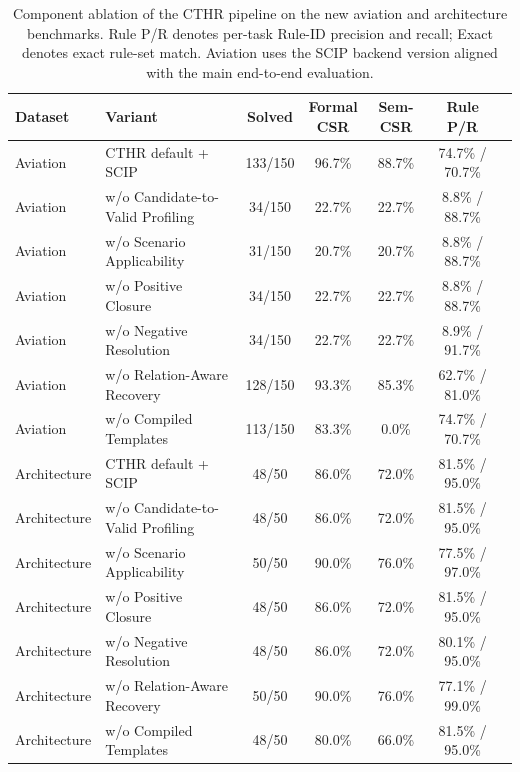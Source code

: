 ﻿\documentclass[a4paper,fleqn]{cas-dc}
\newcommand{\CTHR}{\textsc{CTHR}}
\begin{document}
\begin{table}[t]
\centering
\caption{Component ablation of the \CTHR{} pipeline on the new aviation and architecture benchmarks. Rule P/R denotes per-task Rule-ID precision and recall; Exact denotes exact rule-set match. Aviation uses the SCIP backend version aligned with the main end-to-end evaluation.}
\label{tab:component_ablation}
\scriptsize
\begin{tabular*}{\textwidth}{@{}l@{\extracolsep{\fill}}lccccc@{}}
\toprule
Dataset & Variant & Solved & \shortstack{Formal\\CSR} & Sem-CSR & \shortstack{Rule\\P/R}  \\
\midrule
Aviation & \CTHR{} default + SCIP & 133/150 & 96.7\% & 88.7\% & 74.7\% / 70.7\%  \\
Aviation & w/o Candidate-to-Valid Profiling & 34/150 & 22.7\% & 22.7\% & 8.8\% / 88.7\%  \\
Aviation & w/o Scenario Applicability & 31/150 & 20.7\% & 20.7\% & 8.8\% / 88.7\%  \\
Aviation & w/o Positive Closure & 34/150 & 22.7\% & 22.7\% & 8.8\% / 88.7\%  \\
Aviation & w/o Negative Resolution & 34/150 & 22.7\% & 22.7\% & 8.9\% / 91.7\%  \\
Aviation & w/o Relation-Aware Recovery & 128/150 & 93.3\% & 85.3\% & 62.7\% / 81.0\%  \\
Aviation & w/o Compiled Templates & 113/150 & 83.3\% & 0.0\% & 74.7\% / 70.7\%  \\
\midrule
Architecture & \CTHR{} default + SCIP & 48/50 & 86.0\% & 72.0\% & 81.5\% / 95.0\%  \\
Architecture & w/o Candidate-to-Valid Profiling & 48/50 & 86.0\% & 72.0\% & 81.5\% / 95.0\%  \\
Architecture & w/o Scenario Applicability & 50/50 & 90.0\% & 76.0\% & 77.5\% / 97.0\% \\
Architecture & w/o Positive Closure & 48/50 & 86.0\% & 72.0\% & 81.5\% / 95.0\%  \\
Architecture & w/o Negative Resolution & 48/50 & 86.0\% & 72.0\% & 80.1\% / 95.0\%  \\
Architecture & w/o Relation-Aware Recovery & 50/50 & 90.0\% & 76.0\% & 77.1\% / 99.0\%  \\
Architecture & w/o Compiled Templates & 48/50 & 80.0\% & 66.0\% & 81.5\% / 95.0\%  \\
\bottomrule
\end{tabular*}
\end{table}
\FloatBarrier
\end{document}
